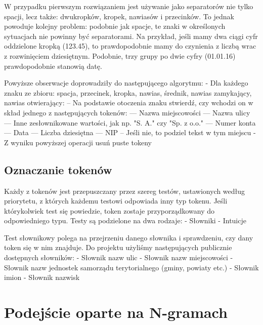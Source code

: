 \documentclass[a4paper,oneside,12pt]{article}
\begin{document}
W przypadku pierwszym rozwiązaniem jest używanie jako separatorów nie tylko spacji, lecz także: dwukropków, kropek, nawiasów i przecinków. To jednak powoduje kolejny problem: podobnie jak spacje, te znaki w określonych sytuacjach nie powinny być separatorami. Na przykład, jeśli mamy dwa ciągi cyfr oddzielone kropką (123.45), to prawdopodobnie mamy do czynienia z liczbą wrac z rozwinięciem dziesiętnym. Podobnie, trzy grupy po dwie cyfry (01.01.16) prawdopodobnie stanowią datę.

Powyższe obserwacje doprowadziły do następującego algorytmu:
- Dla każdego znaku ze zbioru: {spacja, przecinek, kropka, nawias, średnik, nawias zamykający, nawias otwierający}:
-- Na podstawie otoczenia znaku stwierdź, czy wchodzi on w skład jednego z następujących tokenów:
--- Nazwa miejscowości
--- Nazwa ulicy
--- Inne zesłownikowane wartości, jak np. "S. A." czy "Sp. z o.o."
--- Numer konta
--- Data
--- Liczba dziesiętna
--- NIP
-- Jeśli nie, to podziel tekst w tym miejscu
- Z wyniku powyższej operacji usuń puste tokeny

\subsection{Oznaczanie tokenów}

Każdy z tokenów jest przepuszczany przez szereg testów, ustawionych według priorytetu, z których każdemu testowi odpowiada inny typ tokenu. Jeśli którykolwiek test się powiedzie, token zostaje przyporządkowany do odpowiedniego typu. Testy są podzielone na dwa rodzaje:
- Słowniki
- Intuicje
 
Test słownikowy polega na przejrzeniu danego słownika i sprawdzeniu, czy dany token się w nim znajduje. Do projektu użyliśmy następujących publicznie dostępnych słowników:
- Słownik nazw ulic
- Słownik nazw miejscowości
- Słownik nazw jednostek samorządu terytorialnego (gminy, powiaty etc.)
- Słownik imion
- Słownik nazwisk

\section{Podejście oparte na N-gramach}
\end{document}
